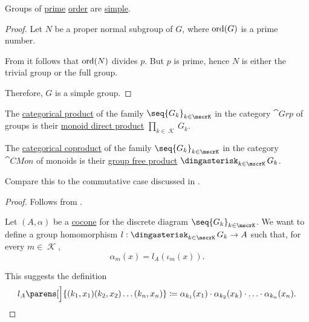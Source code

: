 \begin{proposition}\label{thm:cyclic_groups_are_simple}
  Groups of \hyperref[def:prime_number]{prime} \hyperref[def:group_order]{order} are \hyperref[def:group/simple]{simple}.
\end{proposition}
\begin{proof}
  Let \( N \) be a proper normal subgroup of \( G \), where \( \operatorname{ord}(G) \) is a prime number.

  From  it follows that \( \operatorname{ord}(N) \) divides \( p \). But \( p \) is prime, hence \( N \) is either the trivial group or the full group.

  Therefore, \( G \) is a simple group.
\end{proof}

\begin{proposition}\label{thm:group_categorical_limits}
  \hfill
  \begin{thmenum}
     The \hyperref[def:discrete_category_limits]{categorical product} of the family \( \seq{ G_k }_{k \in \mscrK} \) in the category \hyperref[def:group/category]{\( \cat{Grp} \)} of groups is their \hyperref[def:monoid_direct_product]{monoid direct product} \( \prod_{k \in \mscrK} G_k \).

     The \hyperref[def:discrete_category_limits]{categorical coproduct} of the family \( \seq{ G_k }_{k \in \mscrK} \) in the category \hyperref[def:monoid/category]{\( \cat{CMon} \)} of  monoids is their \hyperref[def:group_free_product]{group free product} \( \Ast_{k \in \mscrK} G_k \).

    Compare this to the commutative case discussed in .
  \end{thmenum}
\end{proposition}
\begin{proof}
   Follows from .

    Let \( (A, \alpha) \) be a \hyperref[def:category_of_cones/cocone]{cocone} for the discrete diagram \( \seq{ G_k }_{k \in \mscrK} \). We want to define a group homomorphism \( l: \Ast_{k \in \mscrK} G_k \to A \) such that, for every \( m \in \mscrK \),
  \begin{equation*}
    \alpha_m(x) = l_A(\iota_m(x)).
  \end{equation*}

  This suggests the definition
  \begin{equation*}
    l_A\parens[\Big]{ (k_1, x_1) (k_2, x_2) \ldots (k_n, x_n) } \coloneqq \alpha_{k_1}(x_1) \cdot \alpha_{k_2}(x_k) \cdot \ldots \cdot \alpha_{k_n}(x_n).
  \end{equation*}
\end{proof}
